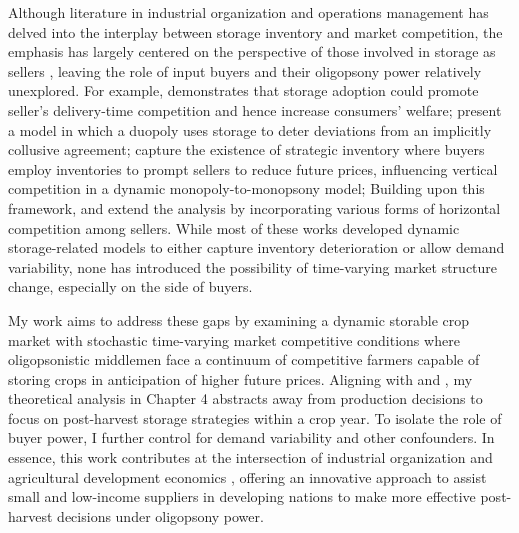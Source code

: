 Although literature in industrial organization and operations management has delved into the interplay between storage inventory and market competition, the emphasis has largely centered on the perspective of those involved in storage as sellers \citep{leng2005game}, leaving the role of input buyers and their oligopsony power relatively unexplored. For example, \cite{li1992role} demonstrates that storage adoption could promote seller's delivery-time competition and hence increase consumers' welfare; \cite{rotemberg1989cyclical} present a model in which a duopoly uses storage to deter deviations from an implicitly collusive agreement; \cite{anand2008strategic} capture the existence of strategic inventory where buyers employ inventories to prompt sellers to reduce future prices, influencing vertical competition in a dynamic monopoly-to-monopsony model; Building upon this framework, \cite{hu2021strategic} and \cite{cai2021supply} extend the analysis by incorporating various forms of horizontal competition among sellers. While most of these works developed dynamic storage-related models to either capture inventory deterioration or allow demand variability, none has introduced the possibility of time-varying market structure change, especially on the side of buyers. 

My work aims to address these gaps by examining a dynamic storable crop market with stochastic time-varying market competitive conditions where oligopsonistic middlemen face a continuum of competitive farmers capable of storing crops in anticipation of higher future prices. Aligning with \cite{porteous2019high} and \cite{ruhinduka2020smallholder}, my theoretical analysis in Chapter 4 abstracts away from production decisions to focus on post-harvest storage strategies within a crop year. To isolate the role of buyer power, I further control for demand variability and other confounders. In essence, this work contributes at the intersection of industrial organization and agricultural development economics \citep{bellemare2022agricultural}, offering an innovative approach to assist small and low-income suppliers in developing nations to make more effective post-harvest decisions under oligopsony power.

